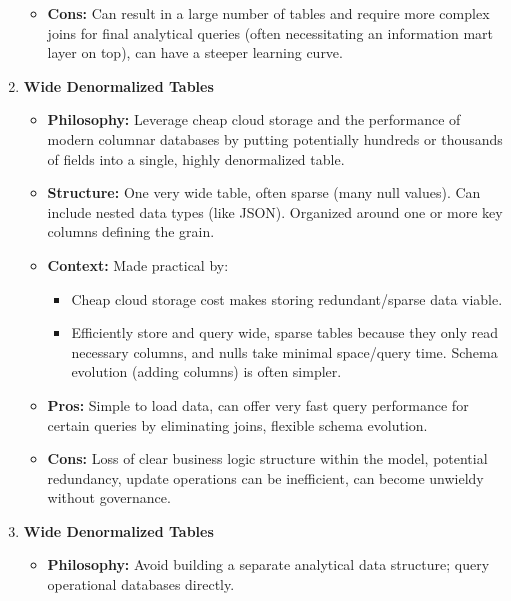 \begin{enumerate}
\begin{itemize}
        \item \textbf{Cons:} Can result in a large number of tables and
        require more complex joins for final analytical queries
        (often necessitating an information mart layer on top),
        can have a steeper learning curve.

    \end{itemize}

    \item \textbf{Wide Denormalized Tables}
    \begin{itemize}
        \item \textbf{Philosophy:} Leverage cheap cloud storage and
        the performance of modern columnar databases by putting
        potentially hundreds or thousands of fields into a single,
        highly denormalized table.

        \item \textbf{Structure:} One very wide table, often sparse
        (many null values). Can include nested data types (like JSON).
        Organized around one or more key columns defining the grain.

        \item \textbf{Context:} Made practical by:
        \begin{itemize}
            \item Cheap cloud storage cost makes storing
            redundant/sparse data viable.
            \item Efficiently store and query wide, sparse tables
            because they only read necessary columns, and nulls take
            minimal space/query time. Schema evolution (adding columns)
            is often simpler.
        \end{itemize}

        \item \textbf{Pros:} Simple to load data, can offer very fast
        query performance for certain queries by eliminating joins,
        flexible schema evolution.

        \item \textbf{Cons:} Loss of clear business logic structure
        within the model, potential redundancy, update operations
        can be inefficient, can become unwieldy without governance.
    \end{itemize}

    \item \textbf{Wide Denormalized Tables}
    \begin{itemize}
        \item \textbf{Philosophy:} Avoid building a separate
        analytical data structure; query operational databases directly.
    

\end{itemize}
\end{enumerate}
